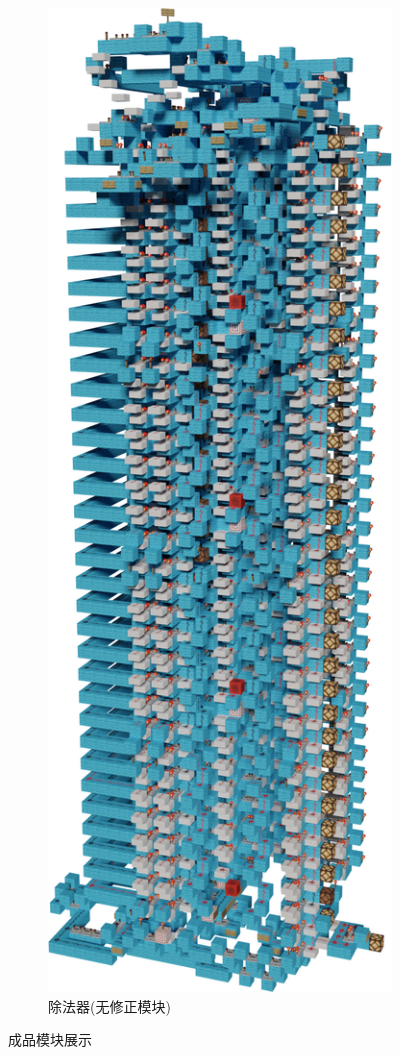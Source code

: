 \documentclass[UTF8,12pt,punct=kaiming,fontset=none]{ctexart}
\begin{document}
\begin{figure}[H]
\begin{subfigure}{1.5in}
        \includegraphics[width=\linewidth]{PSN.png}
        \caption{除法器(无修正模块)}
    \end{subfigure}
    \caption{成品模块展示}
    \label{fig7} %
\end{figure}
\end{document}
